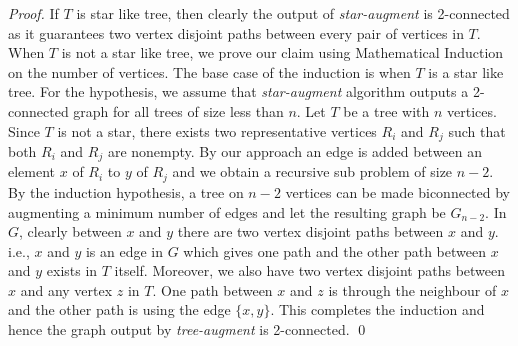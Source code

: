 \documentclass[runningheads]{llncs}
\begin{document}
\begin{proof}
If $T$ is star like tree, then clearly the output of {\em star-augment} is 2-connected as it guarantees two vertex disjoint paths between every pair of vertices in $T$.  When $T$ is not a star like tree, we prove our claim using Mathematical Induction on the number of vertices.  The base case of the induction is when $T$ is a star like tree.  For the hypothesis, we assume that {\em star-augment} algorithm outputs a 2-connected graph for all trees of size less than $n$.  Let $T$ be a tree with $n$ vertices.  Since $T$ is not a star, there exists two representative vertices $R_i$ and $R_j$ such that both $R_i$ and $R_j$ are nonempty.  By our approach an edge is added between an element $x$ of $R_i$ to $y$ of $R_j$ and we obtain a recursive sub problem of size $n-2$.  By the induction hypothesis, a tree on $n-2$ vertices can be made biconnected by augmenting a minimum number of edges and let the resulting graph be $G_{n-2}$.  In $G$, clearly between $x$ and $y$ there are two vertex disjoint paths between $x$ and $y$.  i.e., $x$ and $y$ is an edge in $G$ which gives one path and the other path between $x$ and $y$ exists in $T$ itself.  Moreover, we also have two vertex disjoint paths between $x$ and any vertex $z$ in $T$.  One path between $x$ and $z$ is through the neighbour of $x$ and the other path is using the edge $\{x,y\}$.  This completes the induction and hence the graph output by {\em tree-augment} is 2-connected.   \qed 
\end{proof}
\end{document}
